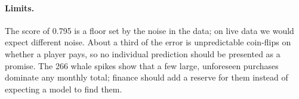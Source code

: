 \documentclass[../main.tex]{subfiles}
\begin{document}
\paragraph{Limits.} The score of 0.795 is a floor set by the noise in the data; on live data we would expect different noise. About a third of the error is unpredictable coin-flips on whether a player pays, so no individual prediction should be presented as a promise. The 266 whale spikes show that a few large, unforeseen purchases dominate any monthly total; finance should add a reserve for them instead of expecting a model to find them.

\endgroup
\end{document}
